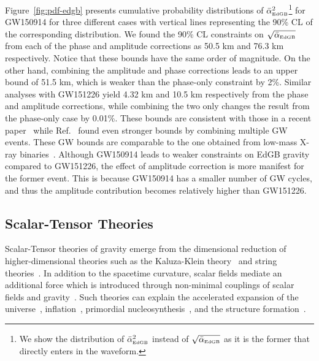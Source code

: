 \documentclass[prd,twocolumn,nofootinbib]{revtex4-1}
\newcommand{\EDGB}{{\mbox{\tiny EdGB}}}
\begin{document}
Figure~\ref{fig:pdf-edgb} presents cumulative probability distributions of $\bar{\alpha}^2_{\EDGB}$\footnote{We show the distribution of $\bar{\alpha}^2_{\EDGB}$ instead of $\sqrt{\bar{\alpha}_{\EDGB}}$ as it is the former that directly enters in the waveform.} for GW150914 for three different cases with vertical lines representing the 90\% CL of the corresponding distribution. We found the 90\% CL constraints on  $\sqrt{\bar{\alpha}_{\EDGB}}$ from each of the phase and amplitude corrections as 50.5 km and 76.3 km respectively. Notice that these bounds have the same order of magnitude. On the other hand, combining the amplitude and phase corrections leads to an upper bound of 51.5 km, which is weaker than the  phase-only constraint by 2\%.
Similar analyses with GW151226 yield 4.32 km and 10.5 km respectively from the phase and amplitude corrections, while combining the two only changes the result from the phase-only case by 0.01\%. These bounds are consistent with those in a recent paper~\cite{Nair:2019iur} while Ref.~\cite{Yamada:2019zrb} found even stronger bounds by combining multiple GW events. These GW bounds are comparable to the one obtained from low-mass X-ray binaries~\cite{Yagi:2012gp}. Although GW150914 leads to weaker constraints on EdGB gravity compared to GW151226, the effect of amplitude correction is more manifest for the former event. This is because GW150914 has a smaller number of GW cycles, and thus the amplitude contribution becomes relatively higher than GW151226.


\subsection{Scalar-Tensor Theories}
Scalar-Tensor theories of gravity emerge from the dimensional reduction of higher-dimensional theories such as the Kaluza-Klein theory~\cite{Fujii:2003pa,Overduin:1998pn} and string theories~\cite{polchinski1,polchinski2}. In addition to the spacetime curvature, scalar fields mediate an additional force which is introduced through non-minimal couplings of scalar fields and gravity~\cite{Berti:2015itd,Chiba:1997ms,PhysRevD.6.2077}. Such theories can explain the accelerated expansion of the universe~\cite{Brax:2004qh,PhysRevD.73.083510,PhysRevD.62.123510,PhysRevD.66.023525,Schimd:2004nq}, inflation~\cite{Burd:1991ns,Barrow:1990nv,Clifton:2011jh}, primordial nucleosynthesis~\cite{Coc:2006rt,Damour:1998ae,Larena:2005tu,Torres:1995je}, and the structure formation~\cite{Brax:2005ew}. 
\end{document}
